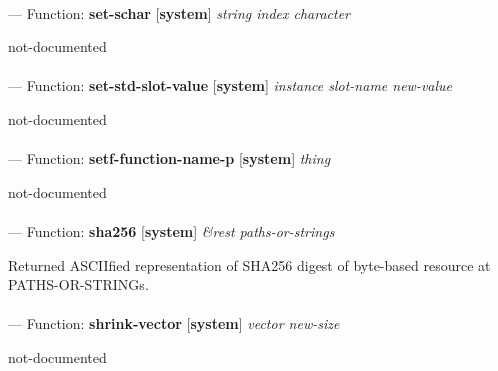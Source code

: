 \paragraph{}
\label{SYSTEM:SET-SCHAR}
--- Function: \textbf{set-schar} [\textbf{system}] \textit{string index character}

\begin{adjustwidth}{5em}{5em}
not-documented
\end{adjustwidth}

\paragraph{}
\label{SYSTEM:SET-STD-SLOT-VALUE}
--- Function: \textbf{set-std-slot-value} [\textbf{system}] \textit{instance slot-name new-value}

\begin{adjustwidth}{5em}{5em}
not-documented
\end{adjustwidth}

\paragraph{}
\label{SYSTEM:SETF-FUNCTION-NAME-P}
--- Function: \textbf{setf-function-name-p} [\textbf{system}] \textit{thing}

\begin{adjustwidth}{5em}{5em}
not-documented
\end{adjustwidth}

\paragraph{}
\label{SYSTEM:SHA256}
--- Function: \textbf{sha256} [\textbf{system}] \textit{\&rest paths-or-strings}

\begin{adjustwidth}{5em}{5em}
Returned ASCIIfied representation of SHA256 digest of byte-based resource at PATHS-OR-STRINGs.
\end{adjustwidth}

\paragraph{}
\label{SYSTEM:SHRINK-VECTOR}
--- Function: \textbf{shrink-vector} [\textbf{system}] \textit{vector new-size}

\begin{adjustwidth}{5em}{5em}
not-documented
\end{adjustwidth}

